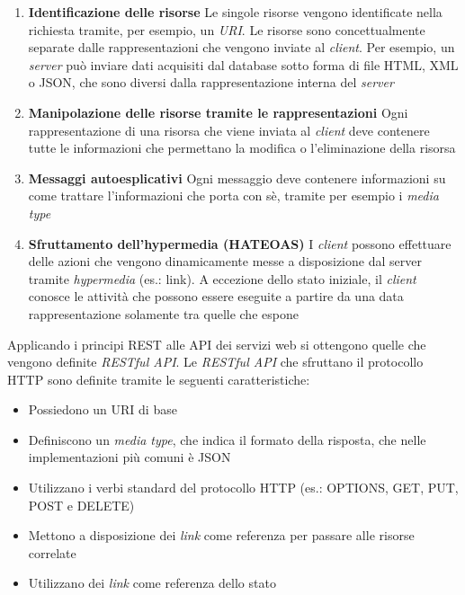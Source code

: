 \begin{itemize}
	\begin{enumerate}
		\item \textbf{Identificazione delle risorse}
		Le singole risorse vengono identificate nella richiesta tramite, per esempio, un \emph{URI}. Le risorse sono concettualmente separate dalle rappresentazioni che vengono inviate al \emph{client}. Per esempio, un \emph{server} può inviare dati acquisiti dal database sotto forma di file HTML, XML o JSON, che sono diversi dalla rappresentazione interna del \emph{server}
		\item \textbf{Manipolazione delle risorse tramite le rappresentazioni}
		Ogni rappresentazione di una risorsa che viene inviata al \emph{client} deve contenere tutte le informazioni che permettano la modifica o l'eliminazione della risorsa
		\item \textbf{Messaggi autoesplicativi}
		Ogni messaggio deve contenere informazioni su come trattare l'informazioni che porta con sè, tramite per esempio i \emph{media type}
		\item \textbf{Sfruttamento dell'hypermedia (HATEOAS)}
		I \emph{client} possono effettuare delle azioni che vengono dinamicamente messe a disposizione dal server tramite \emph{hypermedia} (es.: link). A eccezione dello stato iniziale, il \emph{client} conosce le attività che possono essere eseguite a partire da una data rappresentazione solamente tra quelle che espone
	\end{enumerate}
\end{itemize}

Applicando i principi REST alle API dei servizi web si ottengono quelle che vengono definite \emph{RESTful API}. Le \emph{RESTful API} che sfruttano il protocollo HTTP sono definite tramite le seguenti caratteristiche:

\begin{itemize}
	\item
	Possiedono un URI di base
	\item
	Definiscono un \emph{media type}, che indica il formato della risposta, che nelle implementazioni più comuni è JSON
	\item
	Utilizzano i verbi standard del protocollo HTTP (es.: OPTIONS, GET, PUT, POST e DELETE)
	\item
	Mettono a disposizione dei \emph{link} come referenza per passare alle risorse correlate
	\item
	Utilizzano dei \emph{link} come referenza dello stato
\end{itemize}

